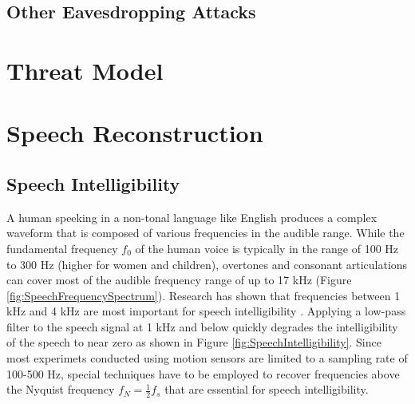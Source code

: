 \documentclass[sigconf, nonacm]{acmart}
\begin{document}
\subsection{Other Eavesdropping Attacks}
\section{Threat Model}
\section{Speech Reconstruction}
\subsection{Speech Intelligibility}
A human speeking in a non-tonal language like English produces a complex waveform that is composed of various frequencies in the audible range.
While the fundamental frequency $f_0$ of the human voice is typically in the range of 100 Hz to 300 Hz (higher for women and children), overtones and consonant articulations can cover most of the audible frequency range of up to 17 kHz (Figure \ref{fig:SpeechFrequencySpectrum}).
Research has shown that frequencies between 1 kHz and 4 kHz are most important for speech intelligibility \cite{DPAMicrophonesFactsAboutSpeechIntelligibility}.
Applying a low-pass filter to the speech signal at 1 kHz and below quickly degrades the intelligibility of the speech to near zero as shown in Figure \ref{fig:SpeechIntelligibility}.
Since most experimets conducted using motion sensors are limited to a sampling rate of 100-500 Hz, special techniques have to be employed to recover frequencies above the Nyquist frequency $f_N = \frac{1}{2}f_s$ that are essential for speech intelligibility.
\end{document}

